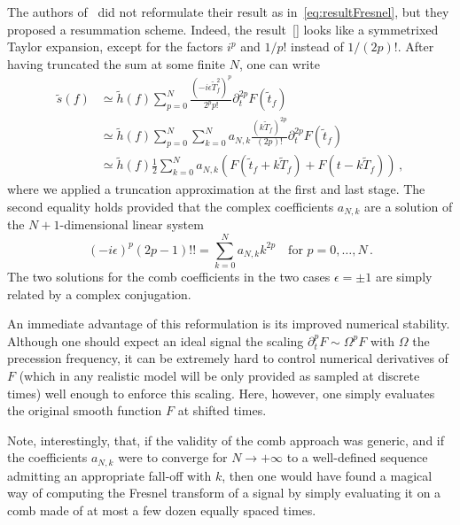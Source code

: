 \documentclass[aps,showpacs,%
prd,superscriptaddress,nofootinbib]{revtex4}
\newcommand{\be}{\begin{equation}}
\newcommand{\ee}{\end{equation}}
\newcommand{\nn}{\nonumber}
\newcommand{\tf}{\tilde{t}_{f}}
\newcommand{\Tf}{\tilde{T}_{f}}
\begin{document}
The authors of~\cite{} did not reformulate their result as in~\eqref{eq:resultFresnel}, but they proposed  a resummation scheme. Indeed, the result~\eqref{} looks like a symmetrixed Taylor expansion, except for the factors $i^{p}$ and $1/p!$ instead of $1/(2p)!$. After having truncated the sum at some finite $N$, one can write
%
\begin{align}\label{eq:resum}
	\tilde{s}(f) &\simeq \tilde{h}(f) \sum\limits_{p = 0}^{N} \frac{(-i\epsilon\Tf^{2})^{p}}{2^{p}p!} \partial_{t}^{2p}F(\tf) \nn\\
	&\simeq \tilde{h}(f) \sum\limits_{p= 0}^{N} \sum\limits_{k=0}^{N} a_{N,k}\frac{(k\Tf)^{2p}}{(2p)!}  \partial_{t}^{2p}F(\tf) \nn\\
	&\simeq \tilde{h}(f) \frac{1}{2}\sum\limits_{k=0}^{N} a_{N,k} \left( F(\tf + k\Tf) + F(t-k\Tf) \right)\,,
\end{align}
%
where we applied a truncation approximation at the first and last stage. The second equality holds provided that the complex coefficients $a_{N,k}$ are a solution of the $N+1$-dimensional linear system
%
\be
	(-i\epsilon)^{p} (2p-1)!! = \sum\limits_{k=0}^{N} a_{N,k} k^{2p} \quad \text{for } p=0,\dots,N \,.
\ee
%
The two solutions for the comb coefficients in the two cases $\epsilon = \pm 1$ are simply related by a complex conjugation.

An immediate advantage of this reformulation is its improved numerical stability. Although one should expect an ideal signal the scaling $\partial_{t}^{p} F \sim \Omega^{p} F$ with $\Omega$ the precession frequency, it can be extremely hard to control numerical derivatives of $F$ (which in any realistic model will be only provided as sampled at discrete times) well enough to enforce this scaling. Here, however, one simply evaluates the original smooth function $F$ at shifted times.

Note, interestingly, that, if the validity of the comb approach was generic, and if the coefficients $a_{N,k}$ were to converge for $N\rightarrow +\infty$ to a well-defined sequence admitting an appropriate fall-off with $k$, then one would have found a magical way of computing the Fresnel transform of a signal by simply evaluating it on a comb made of at most a few dozen equally spaced times.
\end{document}
